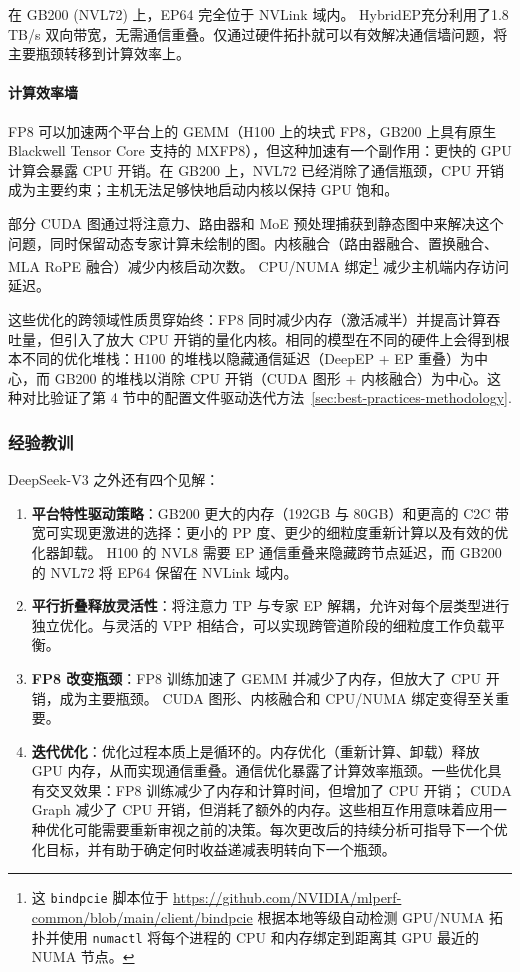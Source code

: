 在 GB200 (NVL72) 上，EP64 完全位于 NVLink 域内。 HybridEP充分利用了1.8\,TB/s 双向带宽，无需通信重叠。仅通过硬件拓扑就可以有效解决通信墙问题，将主要瓶颈转移到计算效率上。

\paragraph*{计算效率墙}
FP8 可以加速两个平台上的 GEMM（H100 上的块式 FP8，GB200 上具有原生 Blackwell Tensor Core 支持的 MXFP8），但这种加速有一个副作用：更快的 GPU 计算会暴露 CPU 开销。在 GB200 上，NVL72 已经消除了通信瓶颈，CPU 开销成为主要约束；主机无法足够快地启动内核以保持 GPU 饱和。

部分 CUDA 图通过将注意力、路由器和 MoE 预处理捕获到静态图中来解决这个问题，同时保留动态专家计算未绘制的图。内核融合（路由器融合、置换融合、MLA RoPE 融合）减少内核启动次数。 CPU/NUMA 绑定\footnote{这 \texttt{bindpcie} 脚本位于 \url{https://github.com/NVIDIA/mlperf-common/blob/main/client/bindpcie} 根据本地等级自动检测 GPU/NUMA 拓扑并使用 \texttt{numactl} 将每个进程的 CPU 和内存绑定到距离其 GPU 最近的 NUMA 节点。} 减少主机端内存访问延迟。

\medskip

这些优化的跨领域性质贯穿始终：FP8 同时减少内存（激活减半）并提高计算吞吐量，但引入了放大 CPU 开销的量化内核。相同的模型在不同的硬件上会得到根本不同的优化堆栈：H100 的堆栈以隐藏通信延迟（DeepEP + EP 重叠）为中心，而 GB200 的堆栈以消除 CPU 开销（CUDA 图形 + 内核融合）为中心。这种对比验证了第 4 节中的配置文件驱动迭代方法~\ref{sec:best-practices-methodology}.

\subsubsection{经验教训}

DeepSeek-V3 之外还有四个见解：

\begin{enumerate}
    \item \textbf{平台特性驱动策略}：GB200 更大的内存（192GB 与 80GB）和更高的 C2C 带宽可实现更激进的选择：更小的 PP 度、更少的细粒度重新计算以及有效的优化器卸载。 H100 的 NVL8 需要 EP 通信重叠来隐藏跨节点延迟，而 GB200 的 NVL72 将 EP64 保留在 NVLink 域内。
    \item \textbf{平行折叠释放灵活性}：将注意力 TP 与专家 EP 解耦，允许对每个层类型进行独立优化。与灵活的 VPP 相结合，可以实现跨管道阶段的细粒度工作负载平衡。
    \item \textbf{FP8 改变瓶颈}：FP8 训练加速了 GEMM 并减少了内存，但放大了 CPU 开销，成为主要瓶颈。 CUDA 图形、内核融合和 CPU/NUMA 绑定变得至关重要。
    \item \textbf{迭代优化}：优化过程本质上是循环的。内存优化（重新计算、卸载）释放 GPU 内存，从而实现通信重叠。通信优化暴露了计算效率瓶颈。一些优化具有交叉效果：FP8 训练减少了内存和计算时间，但增加了 CPU 开销； CUDA Graph 减少了 CPU 开销，但消耗了额外的内存。这些相互作用意味着应用一种优化可能需要重新审视之前的决策。每次更改后的持续分析可指导下一个优化目标，并有助于确定何时收益递减表明转向下一个瓶颈。
\end{enumerate}

